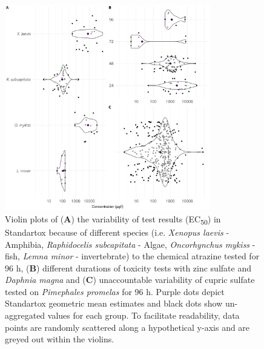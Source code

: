 \documentclass[journal,datadescriptor,accept,moreauthors,pdftex]{Definitions/mdpi}
\begin{document}
\begin{figure}[H]
    \centering
    \includegraphics[width=0.8\textwidth]{article/figures/results_variability.png}
    \caption{Violin plots of (\textbf{A}) the variability of test results (EC\textsubscript{50}) in Standartox because of different species (i.e. \textit{Xenopus laevis} - Amphibia, \textit{Raphidocelis subcapitata} - Algae, \textit{Oncorhynchus mykiss} - fish, \textit{Lemna minor} - invertebrate) to the chemical atrazine tested for 96 h, (\textbf{B}) diﬀerent durations of toxicity tests with zinc sulfate and \textit{Daphnia magna} and (\textbf{C}) unaccountable variability of cupric sulfate tested on \textit{Pimephales promelas} for 96 h. Purple dots depict Standartox geometric mean estimates and black dots show un-aggregated values for each group. To facilitate readability, data points are randomly scattered along a hypothetical y-axis and are greyed out within the violins.}
    \label{fig:stx-variability}
\end{figure}
\end{document}
